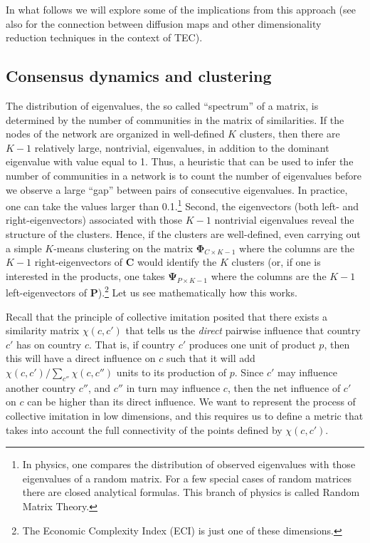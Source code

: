 \documentclass[12pt]{article}
\newcommand{\mtx}[1]{\mathbf{ #1}}
\begin{document}
In what follows we will explore some of the implications from this approach (see also \citealp{mealy2017new} for the connection between diffusion maps and other dimensionality reduction techniques in the context of TEC).

\subsection{Consensus dynamics and clustering}
The distribution of eigenvalues, the so called ``spectrum'' of a matrix, is determined by the number of communities in the matrix of similarities. If the nodes of the network are organized in well-defined $K$ clusters, then there are $K-1$ relatively large, nontrivial, eigenvalues, in addition to the dominant eigenvalue with value equal to 1. Thus, a heuristic that can be used to infer the number of communities in a network is to count the number of eigenvalues before we observe a large ``gap'' between pairs of consecutive eigenvalues. In practice, one can take the values larger than 0.1.\footnote{In physics, one compares the distribution of observed eigenvalues with those eigenvalues of a random matrix. For a few special cases of random matrices there are closed analytical formulas. This branch of physics is called Random Matrix Theory.} Second, the eigenvectors (both left- and right-eigenvectors) associated with those $K-1$ nontrivial eigenvalues reveal the structure of the clusters. Hence, if the clusters are well-defined, even carrying out a simple $K$-means clustering on the matrix $\mtx{\Phi}_{C\times K-1}$ where the columns are the $K-1$ right-eigenvectors of $\mtx{C}$  would identify the $K$ clusters (or, if one is interested in the products, one takes $\mtx{\Psi}_{P\times K-1}$ where the columns are the $K-1$ left-eigenvectors of $\mtx{P}$).\footnote{The Economic Complexity Index (ECI) is just one of these dimensions.} Let us see mathematically how this works. 

Recall that the principle of collective imitation posited that there exists a similarity matrix $\chi(c, c')$ that tells us the \emph{direct} pairwise influence that country $c'$ has on country $c$. That is, if country $c'$ produces one unit of product $p$, then this will have a direct influence on $c$ such that it will add $\chi(c, c')/\sum_{c''}\chi(c, c'')$ units to its production of $p$. Since $c'$ may influence another country $c''$, and $c''$ in turn may influence $c$, then the net influence of $c'$ on $c$ can be higher than its direct influence. We want to represent the process of collective imitation in low dimensions, and this requires us to define a metric that takes into account the full connectivity of the points defined by $\chi(c, c')$.
\end{document}

